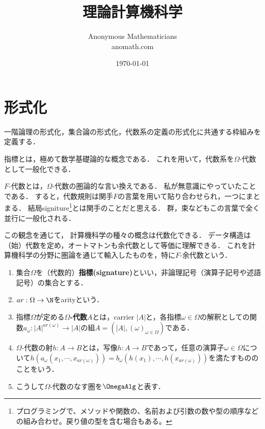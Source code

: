 \documentclass[uplatex, dvipdfmx]{jsreport}
\title{理論計算機科学}
\author{Anonymous Mathematicians\\anomath.com}
\date{\today}
\begin{document}
\tableofcontents

\section{形式化}

\begin{screen}
    一階論理の形式化，集合論の形式化，代数系の定義の形式化に共通する枠組みを定義する．

    指標とは，極めて数学基礎論的な概念である．
    これを用いて，代数系を$\Omega$-代数として一般化できる．

    $F$-代数とは，$\Omega$-代数の圏論的な言い換えである．
    私が無意識にやっていたことである．
    すると，代数規則は関手$F$の言葉を用いて貼り合わせられ，一つにまとまる．
    結局signiture\footnote{プログラミングで、メソッドや関数の、名前および引数の数や型の順序などの組み合わせ。戻り値の型を含む場合もある。}とは関手のことだと思える．
    群，束などもこの言葉で全く並行に一般化される．

    この観念を通じて，
    計算機科学の種々の概念は代数化できる．
    データ構造は（始）代数を定め，オートマトンも余代数として等価に理解できる．
    これを計算機科学の分野に圏論を通じて輸入したものを，特に$F$-余代数という．
\end{screen}

\begin{definition}\mbox{}
    \begin{enumerate}
        \item 集合$\Omega$を（代数的）\textbf{指標(signature)}といい，非論理記号（演算子記号や述語記号）の集合とする．
        \item $ar:\Omega\to\N$をarityという．
        \item 指標$\Omega$が定める\textbf{$\Omega$-代数}$A$とは，carrier $|A|$と，各指標$\omega\in\Omega$の解釈としての関数$a_\omega:|A|^{ar(\omega)}\to|A|$の組$A=(|A|,(\omega)_{\omega\in\Omega})$である．
        \item $\Omega$-代数の射$h:A\to B$とは，写像$h:A\to B$であって，任意の演算子$\omega\in\Omega$について$h(a_\omega(x_1,\cdots,x_{ar(\omega)}))=b_\omega(h(x_1),\cdots,h(x_{ar(\omega)}))$を満たすもののことをいう．
        \item こうして$\Omega$-代数のなす圏を$\OmegaAlg$と表す．
    \end{enumerate}
\end{definition}
\end{document}
